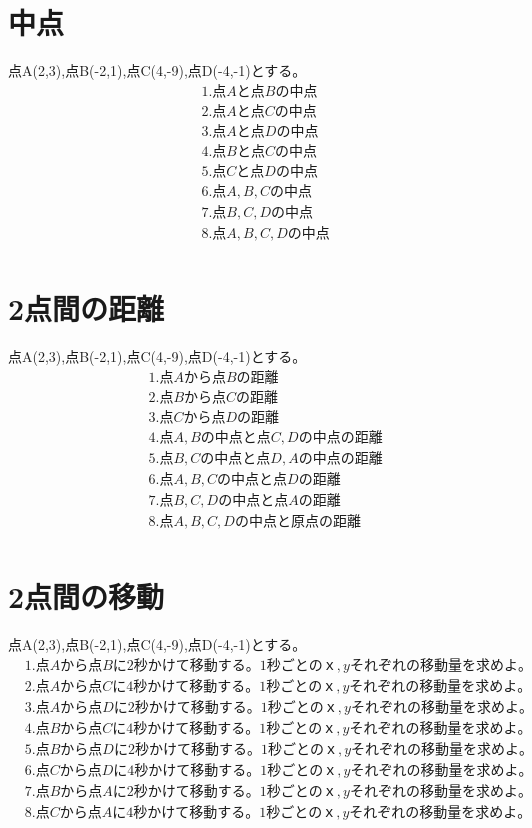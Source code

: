 \documentclass[paper=b4j,landscape,twocolumn,fleqn]{jlreq}
\begin{document}
\section{中点}
点A(2,3),点B(-2,1),点C(4,-9),点D(-4,-1)とする。
\begin{align*}
　&1.　点Aと点Bの中点\\[1em]
　&2.　点Aと点Cの中点\\[1em]
　&3.　点Aと点Dの中点\\[1em]
　&4.　点Bと点Cの中点\\[1em]
　&5.　点Cと点Dの中点\\[1em]
　&6.　点A,B,Cの中点\\[1em]
　&7.　点B,C,Dの中点\\[1em]
　&8.　点A,B,C,Dの中点\\[1em]
\end{align*}
\section{2点間の距離}
点A(2,3),点B(-2,1),点C(4,-9),点D(-4,-1)とする。
\begin{align*}
　&1.　点Aから点Bの距離\\[1em]
　&2.　点Bから点Cの距離\\[1em]
　&3.　点Cから点Dの距離\\[1em]
　&4.　点A,Bの中点と点C,Dの中点の距離\\[1em]
　&5.　点B,Cの中点と点D,Aの中点の距離\\[1em]
　&6.　点A,B,Cの中点と点Dの距離\\[1em]
　&7.　点B,C,Dの中点と点Aの距離\\[1em]
　&8.　点A,B,C,Dの中点と原点の距離\\[1em]
\end{align*}

\newpage
\section{2点間の移動}
点A(2,3),点B(-2,1),点C(4,-9),点D(-4,-1)とする。
\begin{align*}
　&1.　点Aから点Bに2秒かけて移動する。1秒ごとのｘ,yそれぞれの移動量を求めよ。\\[1em]
　&2.　点Aから点Cに4秒かけて移動する。1秒ごとのｘ,yそれぞれの移動量を求めよ。\\[1em]
　&3.　点Aから点Dに2秒かけて移動する。1秒ごとのｘ,yそれぞれの移動量を求めよ。\\[1em]
　&4.　点Bから点Cに4秒かけて移動する。1秒ごとのｘ,yそれぞれの移動量を求めよ。\\[1em]
　&5.　点Bから点Dに2秒かけて移動する。1秒ごとのｘ,yそれぞれの移動量を求めよ。\\[1em]
　&6.　点Cから点Dに4秒かけて移動する。1秒ごとのｘ,yそれぞれの移動量を求めよ。\\[1em]
　&7.　点Bから点Aに2秒かけて移動する。1秒ごとのｘ,yそれぞれの移動量を求めよ。\\[1em]
　&8.　点Cから点Aに4秒かけて移動する。1秒ごとのｘ,yそれぞれの移動量を求めよ。\\[1em]
\end{align*}
\end{document}
